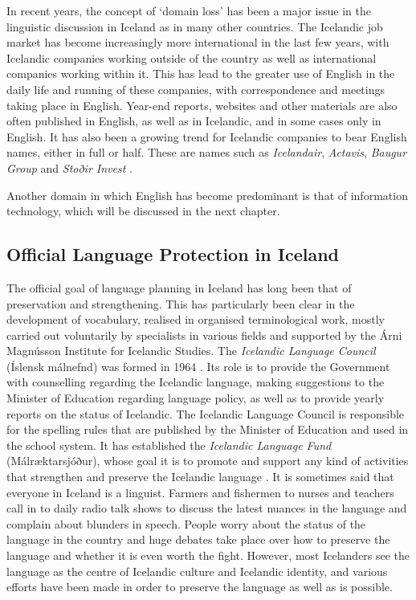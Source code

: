 \documentclass{../../metanetpaper}
\begin{document}
\begin{multicols}{2}
In recent years, the concept of ‘domain loss’ has been a major issue in the linguistic discussion in Iceland as in many other countries. The Icelandic job market has become increasingly more international in the last few years, with Icelandic companies working outside of the country as well as international companies working within it. This has lead to the greater use of English in the daily life and running of these companies, with correspondence and meetings taking place in English. Year-end reports, websites and other materials are also often published in English, as well as in Icelandic, and in some cases only in English. It has also been a growing trend for Icelandic companies to bear English names, either in full or half. These are names such as \textit{Icelandair}, \textit{Actavis}, \textit{Baugur Group} and \textit{Stoðir Invest} \cite{isl1}.  

Another domain in which English has become predominant is that of information technology, which will be discussed in the next chapter.

\subsection{Official Language Protection in Iceland}

The official goal of language planning in Iceland has long been that of preservation and strengthening. This has particularly been clear in the development of vocabulary, realised in organised terminological work, mostly carried out voluntarily by specialists in various fields and supported by the Árni Magnússon Institute for Icelandic Studies. The \textit{Icelandic Language Council} (Íslensk málnefnd) was formed in 1964 \cite{arn1}.  Its role is to provide the Government with counselling regarding the Icelandic language, making suggestions to the Minister of Education regarding language policy, as well as to provide yearly reports on the status of Icelandic. The Icelandic Language Council is responsible for the spelling rules that are published by the Minister of Education and used in the school system. It has established the \textit{Icelandic Language Fund} (Málræktarsjóður), whose goal it is to promote and support any kind of activities that strengthen and preserve the Icelandic language \cite{arn2}.
It is sometimes said that everyone in Iceland is a linguist. Farmers and fishermen to nurses and teachers call in to daily radio talk shows to discuss the latest nuances in the language and complain about blunders in speech. People worry about the status of the language in the country and huge debates take place over how to preserve the language and whether it is even worth the fight. However, most Icelanders see the language as the centre of Icelandic culture and Icelandic identity, and various efforts have been made in order to preserve the language as well as is possible.


\end{multicols}
\end{document}
